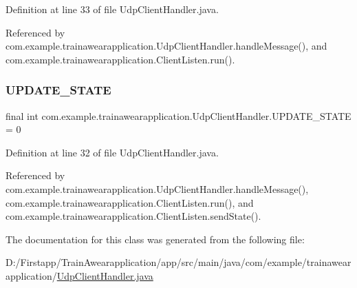 Definition at line 33 of file Udp\+Client\+Handler.\+java.



Referenced by com.\+example.\+trainawearapplication.\+Udp\+Client\+Handler.\+handle\+Message(), and com.\+example.\+trainawearapplication.\+Client\+Listen.\+run().

\mbox{\label{classcom_1_1example_1_1trainawearapplication_1_1_udp_client_handler_abb97ab46d1d8c23159f9ea1319425a5c}} 
\subsubsection{\texorpdfstring{UPDATE\_STATE}{UPDATE\_STATE}}
{\footnotesize\ttfamily final int com.\+example.\+trainawearapplication.\+Udp\+Client\+Handler.\+U\+P\+D\+A\+T\+E\+\_\+\+S\+T\+A\+TE = 0\hspace{0.3cm}{\ttfamily [static]}}



Definition at line 32 of file Udp\+Client\+Handler.\+java.



Referenced by com.\+example.\+trainawearapplication.\+Udp\+Client\+Handler.\+handle\+Message(), com.\+example.\+trainawearapplication.\+Client\+Listen.\+run(), and com.\+example.\+trainawearapplication.\+Client\+Listen.\+send\+State().



The documentation for this class was generated from the following file\+:\begin{DoxyCompactItemize}
\item 
D\+:/\+Firstapp/\+Train\+Awearapplication/app/src/main/java/com/example/trainawearapplication/\mbox{\hyperlink{_udp_client_handler_8java}{Udp\+Client\+Handler.\+java}}\end{DoxyCompactItemize}
